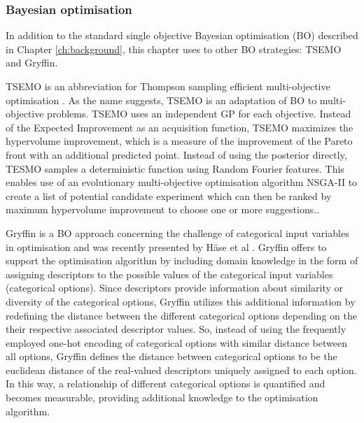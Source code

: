 \subsubsection{Bayesian optimisation}

In addition to the standard single objective Bayesian optimisation (BO) described in Chapter \ref{ch:background}, this chapter uses to other BO strategies: TSEMO and Gryffin.

TSEMO is an abbreviation for Thompson sampling efficient multi-objective optimisation \cite{Bradford2018}. As the name suggests, TSEMO is an adaptation of BO to multi-objective problems. TSEMO uses an independent GP for each objective. Instead of the Expected Improvement as an acquisition function, TSEMO maximizes the hypervolume improvement, which is a measure of the improvement of the Pareto front with an additional predicted point. Instead of using the posterior directly, TESMO samples a deterministic function using Random Fourier features. This enables use of an evolutionary multi-objective optimisation algorithm NSGA-II \cite{Deb2002} to create a list of potential candidate experiment which can then be ranked by maximum hypervolume improvement to choose one or more suggestions..

Gryffin is a BO approach concerning the challenge of categorical input variables in optimisation and was recently presented by H{\"{a}}se et al \cite{Hase2020a}. Gryffin offers to support the optimisation algorithm by including domain knowledge in the form of assigning descriptors to the possible values of the categorical input variables (categorical options). Since descriptors provide information about similarity or diversity of the categorical options, Gryffin utilizes this additional information by redefining the distance between the different categorical options depending on the their respective associated descriptor values. So, instead of using the frequently employed one-hot encoding of categorical options with similar distance between all options,  Gryffin defines the distance between categorical options to be the euclidean distance of the real-valued descriptors uniquely assigned to each option. In this way, a relationship of different categorical options is quantified and becomes measurable, providing additional knowledge to the optimisation algorithm. 


